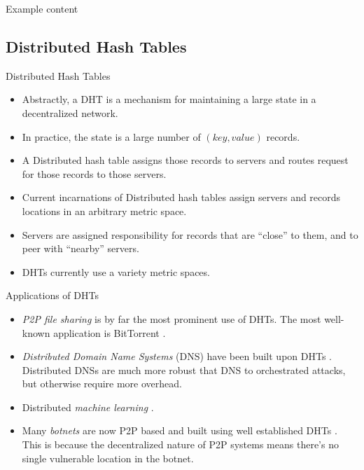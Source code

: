 \documentclass[8pt]{beamer}
\begin{document}
			
	\begin{frame}{Example}
		content
	\end{frame}
				
		
		
	
\subsection{Distributed Hash Tables}
	\begin{frame}{Distributed Hash Tables}
		\begin{itemize}
			\item Abstractly, a DHT is a mechanism for maintaining a large state in a decentralized network.
			\item In practice, the state is a large number of $ (key, value) $ records.
			\item A Distributed hash table assigns those records to servers and routes request for those records to those servers.
			\item Current incarnations of Distributed hash tables assign servers and records locations in an arbitrary metric space.
			\item Servers are assigned responsibility for records that are ``close'' to them, and to peer with ``nearby'' servers.
			\item DHTs currently use a variety metric spaces.
		\end{itemize}


	\end{frame}

	\begin{frame}{Applications of DHTs}
		\begin{itemize}
			\item \textit{P2P file sharing} is by far the most prominent use of DHTs.  
			The most well-known application is BitTorrent \cite{bittorrent}.
			\item \textit{Distributed Domain Name Systems} (DNS) have been built upon DHTs \cite{cox2002serving} \cite{pappas2006comparative}.
			Distributed DNSs are much more robust that DNS to orchestrated attacks, but otherwise require more overhead.
			\item Distributed \textit{machine learning} \cite{liparameter}.
			\item Many \textit{botnets} are now P2P based and built using well established DHTs \cite{saad2011detecting}. 
			This is because the decentralized nature of P2P systems means there's no single vulnerable location in the botnet.
		\end{itemize}
	\end{frame}
\end{document}
